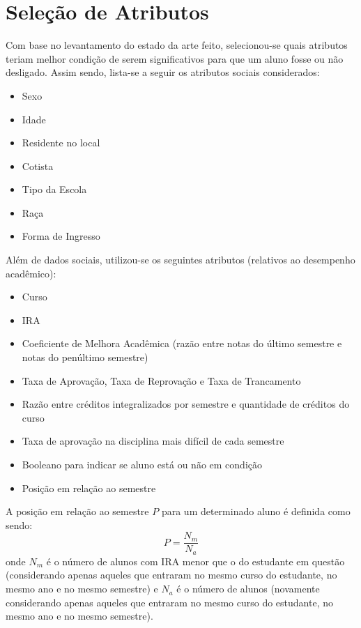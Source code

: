 \section{Seleção de Atributos}
Com base no levantamento do estado da arte feito, selecionou-se quais atributos
teriam melhor condição de serem significativos para que um aluno fosse ou não
desligado. Assim sendo, lista-se a seguir os atributos sociais considerados:
\begin{itemize}
        \item Sexo
        \item Idade
        \item Residente no local 
        \item Cotista 
        \item Tipo da Escola 
        \item Raça
        \item Forma de Ingresso
\end{itemize}

Além de dados sociais, utilizou-se os seguintes atributos (relativos ao desempenho
acadêmico): 
\begin{itemize}
    \item Curso
    \item IRA
    \item Coeficiente de Melhora Acadêmica (razão entre notas do último semestre e
        notas do penúltimo semestre)
    \item Taxa de Aprovação, Taxa de Reprovação e Taxa de Trancamento
    \item Razão entre créditos integralizados por semestre e quantidade de créditos
        do curso
    \item Taxa de aprovação na disciplina mais difícil de cada semestre
    \item Booleano para indicar se aluno está ou não em condição
    \item Posição em relação ao semestre
\end{itemize}
A posição em relação ao semestre $P$ para um determinado aluno é definida como sendo:
\begin{equation}
    P = \frac{N_m}{N_a}
\end{equation}
onde $N_m$ é o número de alunos com IRA menor que o do estudante em questão
(considerando apenas aqueles que entraram no mesmo curso do estudante, no mesmo ano e
no mesmo semestre) e $N_a$ é o número de alunos (novamente considerando apenas
aqueles que entraram no mesmo curso do estudante, no mesmo ano e no mesmo semestre). 

